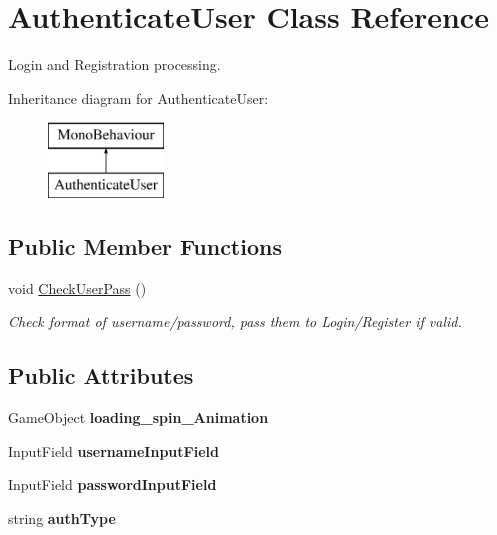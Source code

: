 \hypertarget{class_authenticate_user}{}\section{Authenticate\+User Class Reference}
\label{class_authenticate_user}


Login and Registration processing.  


Inheritance diagram for Authenticate\+User\+:\begin{figure}[H]
\begin{center}
\leavevmode
\includegraphics[height=2.000000cm]{class_authenticate_user}
\end{center}
\end{figure}
\subsection*{Public Member Functions}
\begin{DoxyCompactItemize}
\item 
\mbox{\label{class_authenticate_user_a6d1abb9b546a5fa3016bb6063e3eabaa}} 
void \mbox{\hyperlink{class_authenticate_user_a6d1abb9b546a5fa3016bb6063e3eabaa}{Check\+User\+Pass}} ()
\begin{DoxyCompactList}\small\item\em Check format of username/password, pass them to Login/\+Register if valid. \end{DoxyCompactList}\end{DoxyCompactItemize}
\subsection*{Public Attributes}
\begin{DoxyCompactItemize}
\item 
\mbox{\label{class_authenticate_user_af6ef34075c6ae8b71ccdadf4db3ab2f5}} 
Game\+Object {\bfseries loading\+\_\+spin\+\_\+\+Animation}
\item 
\mbox{\label{class_authenticate_user_a38f2b4577d8f375bb33d3eab2e669774}} 
Input\+Field {\bfseries username\+Input\+Field}
\item 
\mbox{\label{class_authenticate_user_a5def6ad7e62bddc9a48cffee77c04168}} 
Input\+Field {\bfseries password\+Input\+Field}
\item 
\mbox{\label{class_authenticate_user_a299b64de03d6461c988a78593365624b}} 
string {\bfseries auth\+Type}
\end{DoxyCompactItemize}
